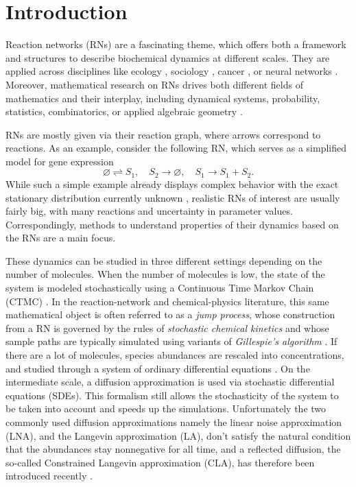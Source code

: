 \documentclass[10pt,a4paper]{amsart}
\let\emptyset\varnothing
\theoremstyle{definition}
\theoremstyle{remark}
\theoremstyle{consequence}
\numberwithin{equation}{section}
\begin{document}


\section{Introduction}\label{summary_1}


Reaction networks (RNs) are a fascinating theme, which offers both a framework and structures to describe biochemical dynamics at different scales.
They are applied across disciplines like ecology \cite{ecol_May}, sociology \cite{sociology}, cancer \cite{cancer1,cancer2}, or neural networks \cite{Goutsias_ov}. Moreover, mathematical research on RNs drives both different fields of mathematics and their interplay, including dynamical systems, probability, statistics, combinatorics, or applied algebraic geometry \cite{anderson2,craciun2,overv_Gorban,HOESSLY_WIUF_XIA_2023,approx_kurtz,Hoessly_esc}.

RNs are mostly given via their reaction graph, where arrows correspond to reactions. As an example, consider the following RN, which serves as a simplified model for gene expression \cite{Thattai8614}
 \begin{equation} \label{eq_gene}\emptyset \rightleftharpoons S_1,\quad S_2\to \emptyset,\quad S_1\to S_1+S_2.\end{equation}
 While such a simple example already displays complex behavior with the exact stationary distribution currently unknown \cite{Thattai8614}, realistic RNs of interest are usually fairly big, with many reactions and uncertainty in parameter values. Correspondingly, methods to understand properties of their dynamics based on the RNs are a main focus.

 These dynamics can be studied in three different settings depending on the number of molecules. When the number of molecules is low, the state of the system is modeled stochastically using a Continuous Time Markov Chain (CTMC) \cite{approx_kurtz,mcquarrie_1967}.
{In the reaction-network and chemical-physics literature, this same mathematical object is often referred to as a \emph{jump process}, whose construction from a RN is governed by the rules of \emph{stochastic chemical kinetics} and whose sample paths are typically simulated using variants of \emph{Gillespie’s algorithm} \cite{gillespiea,gillespieb}.} If there are a lot of molecules, species abundances are rescaled into concentrations, and studied through a system of ordinary differential equations \cite{craciun2,Feliuinj,Michaelis_M,Wegscheider}. 
 On the intermediate scale, a diffusion approximation is used \cite{Kurtz1976,KURTZ1978,approx_kurtz} via stochastic differential equations (SDEs). This formalism still allows the stochasticity of the system to be taken into account and speeds up the simulations. Unfortunately the two commonly used diffusion approximations namely the linear noise approximation (LNA), and the Langevin approximation (LA), don't satisfy the natural condition that the abundances stay nonnegative for all time, and a reflected diffusion, the so-called Constrained Langevin approximation (CLA), has therefore been introduced recently \cite{leite2019}.
\end{document}
